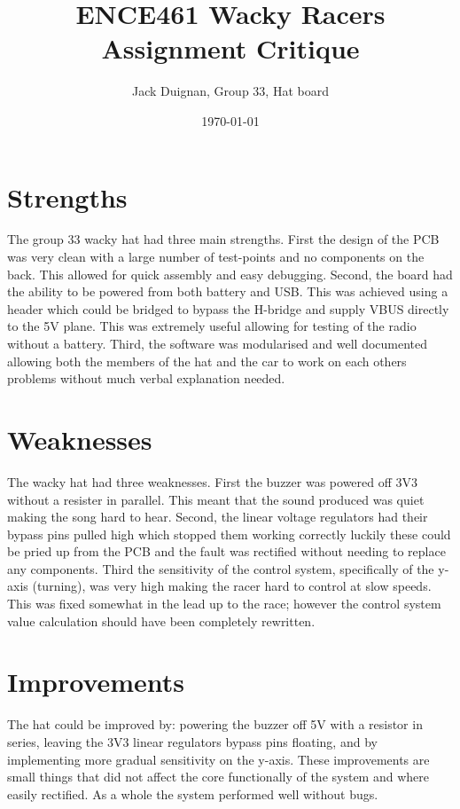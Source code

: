 \documentclass[a4paper,12pt]{article}
\title{ENCE461 Wacky Racers Assignment Critique}
\author{Jack Duignan, Group 33, Hat board}
\date{\today}
\begin{document}
\maketitle

\section{Strengths}

The group 33 wacky hat had three main strengths. First the design of the PCB was very clean with a large number of test-points and no components on the back. This allowed for quick assembly and easy debugging. Second, the board had the ability to be powered from both battery and USB. This was achieved using a header which could be bridged to bypass the H-bridge and supply VBUS directly to the 5V plane. This was extremely useful allowing for testing of the radio without a battery. Third, the software was modularised and well documented allowing both the members of the hat and the car to work on each others problems without much verbal explanation needed.

\section{Weaknesses}

The wacky hat had three weaknesses. First the buzzer was powered off 3V3 without a resister in parallel. This meant that the sound produced was quiet making the song hard to hear. Second, the linear voltage regulators had their bypass pins pulled high which stopped them working correctly luckily these could be pried up from the PCB and the fault was rectified without needing to replace any components. Third the sensitivity of the control system, specifically of the y-axis (turning), was very high making the racer hard to control at slow speeds. This was fixed somewhat in the lead up to the race; however the control system value calculation should have been completely rewritten.

\section{Improvements}

The hat could be improved by: powering the buzzer off 5V with a resistor in series, leaving the 3V3 linear regulators bypass pins floating, and by implementing more gradual sensitivity on the y-axis. These improvements are small things that did not affect the core functionally of the system and where easily rectified. As a whole the system performed well without bugs.
\end{document}
